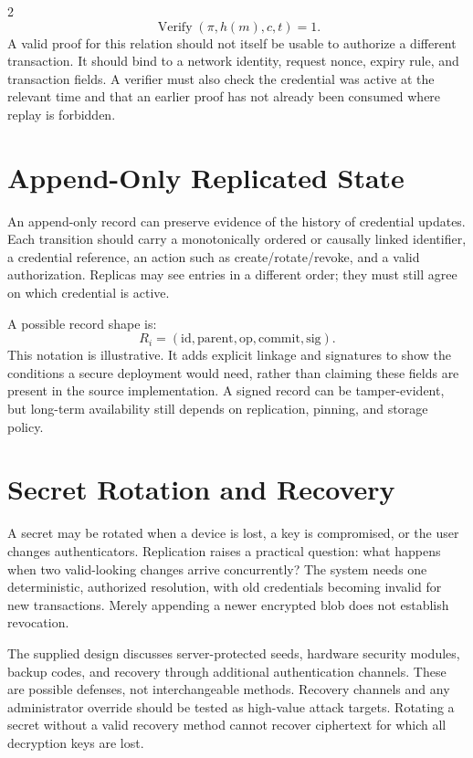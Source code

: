 \documentclass[10pt,letterpaper]{article}
\begin{document}
\begin{multicols}{2}
\begin{equation}
 \operatorname{Verify}(\pi, h(m),c,t)=1.
\end{equation}
A valid proof for this relation should not itself be usable to authorize a different transaction. It should bind to a network identity, request nonce, expiry rule, and transaction fields. A verifier must also check the credential was active at the relevant time and that an earlier proof has not already been consumed where replay is forbidden.

\section{Append-Only Replicated State}
An append-only record can preserve evidence of the history of credential updates. Each transition should carry a monotonically ordered or causally linked identifier, a credential reference, an action such as create/rotate/revoke, and a valid authorization. Replicas may see entries in a different order; they must still agree on which credential is active.

A possible record shape is:
\begin{equation}
 R_i=(\mathrm{id},\mathrm{parent},\mathrm{op},\mathrm{commit},\mathrm{sig}).
\end{equation}
This notation is illustrative. It adds explicit linkage and signatures to show the conditions a secure deployment would need, rather than claiming these fields are present in the source implementation. A signed record can be tamper-evident, but long-term availability still depends on replication, pinning, and storage policy.

\section{Secret Rotation and Recovery}
A secret may be rotated when a device is lost, a key is compromised, or the user changes authenticators. Replication raises a practical question: what happens when two valid-looking changes arrive concurrently? The system needs one deterministic, authorized resolution, with old credentials becoming invalid for new transactions. Merely appending a newer encrypted blob does not establish revocation.

The supplied design discusses server-protected seeds, hardware security modules, backup codes, and recovery through additional authentication channels. These are possible defenses, not interchangeable methods. Recovery channels and any administrator override should be tested as high-value attack targets. Rotating a secret without a valid recovery method cannot recover ciphertext for which all decryption keys are lost.


\end{multicols}
\end{document}
